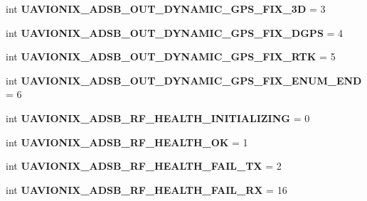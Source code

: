 \begin{DoxyCompactItemize}
int {\bfseries U\+A\+V\+I\+O\+N\+I\+X\+\_\+\+A\+D\+S\+B\+\_\+\+O\+U\+T\+\_\+\+D\+Y\+N\+A\+M\+I\+C\+\_\+\+G\+P\+S\+\_\+\+F\+I\+X\+\_\+3D} = 3
\item 
\mbox{\label{namespacepymavlink_1_1dialects_1_1v10_af556a57ec70f2cfc5bb7e29d07babbf0}} 
int {\bfseries U\+A\+V\+I\+O\+N\+I\+X\+\_\+\+A\+D\+S\+B\+\_\+\+O\+U\+T\+\_\+\+D\+Y\+N\+A\+M\+I\+C\+\_\+\+G\+P\+S\+\_\+\+F\+I\+X\+\_\+\+D\+G\+PS} = 4
\item 
\mbox{\label{namespacepymavlink_1_1dialects_1_1v10_a655f23e7cb9808ebe32c3810f521ff77}} 
int {\bfseries U\+A\+V\+I\+O\+N\+I\+X\+\_\+\+A\+D\+S\+B\+\_\+\+O\+U\+T\+\_\+\+D\+Y\+N\+A\+M\+I\+C\+\_\+\+G\+P\+S\+\_\+\+F\+I\+X\+\_\+\+R\+TK} = 5
\item 
\mbox{\label{namespacepymavlink_1_1dialects_1_1v10_abb8fad5693ac39185d59dac3cd8d26ed}} 
int {\bfseries U\+A\+V\+I\+O\+N\+I\+X\+\_\+\+A\+D\+S\+B\+\_\+\+O\+U\+T\+\_\+\+D\+Y\+N\+A\+M\+I\+C\+\_\+\+G\+P\+S\+\_\+\+F\+I\+X\+\_\+\+E\+N\+U\+M\+\_\+\+E\+ND} = 6
\item 
\mbox{\label{namespacepymavlink_1_1dialects_1_1v10_a4f35cb5fadd7bc9d7ab705314841561d}} 
int {\bfseries U\+A\+V\+I\+O\+N\+I\+X\+\_\+\+A\+D\+S\+B\+\_\+\+R\+F\+\_\+\+H\+E\+A\+L\+T\+H\+\_\+\+I\+N\+I\+T\+I\+A\+L\+I\+Z\+I\+NG} = 0
\item 
\mbox{\label{namespacepymavlink_1_1dialects_1_1v10_ac6c446787a9e0f1b6f0be5919d947aec}} 
int {\bfseries U\+A\+V\+I\+O\+N\+I\+X\+\_\+\+A\+D\+S\+B\+\_\+\+R\+F\+\_\+\+H\+E\+A\+L\+T\+H\+\_\+\+OK} = 1
\item 
\mbox{\label{namespacepymavlink_1_1dialects_1_1v10_a73b87bf1024a6bbe19913dc5b79ea425}} 
int {\bfseries U\+A\+V\+I\+O\+N\+I\+X\+\_\+\+A\+D\+S\+B\+\_\+\+R\+F\+\_\+\+H\+E\+A\+L\+T\+H\+\_\+\+F\+A\+I\+L\+\_\+\+TX} = 2
\item 
\mbox{\label{namespacepymavlink_1_1dialects_1_1v10_aa240d9a609e14d9d8cb5fa89bd6784ca}} 
int {\bfseries U\+A\+V\+I\+O\+N\+I\+X\+\_\+\+A\+D\+S\+B\+\_\+\+R\+F\+\_\+\+H\+E\+A\+L\+T\+H\+\_\+\+F\+A\+I\+L\+\_\+\+RX} = 16

\end{DoxyCompactItemize}
